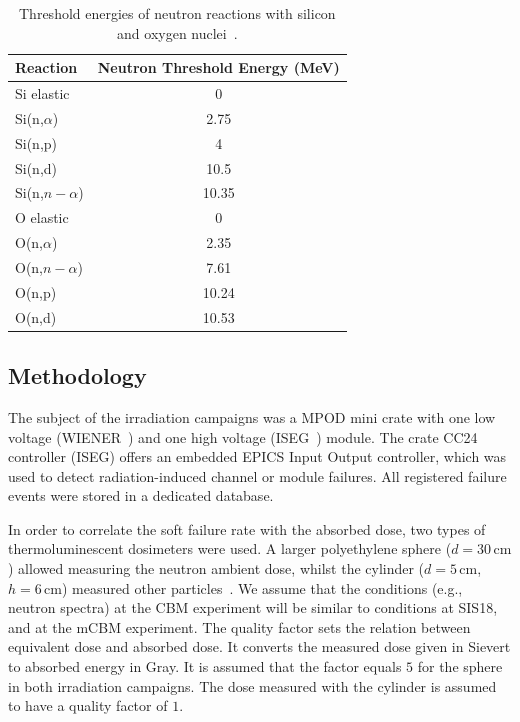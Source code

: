 \begin{table}[!h]
\centering
\caption{Threshold energies of neutron reactions with silicon and oxygen nuclei~\cite{ENDF}.}
\begin{tabular}{lc}
\hline
Reaction         & Neutron Threshold Energy (MeV) \\ \hline
Si elastic       & 0                              \\
Si(n,$\alpha$)   & 2.75                           \\
Si(n,p)          & 4                              \\
Si(n,d)          & 10.5                           \\
Si(n,$n-\alpha$) & 10.35                          \\ \hline
O elastic        & 0                              \\
O(n,$\alpha$)    & 2.35                           \\
O(n,$n-\alpha$)  & 7.61                           \\
O(n,p)           & 10.24                          \\
O(n,d)           & 10.53                         
\end{tabular}

\label{cross-seciton}
\end{table}


\subsection{Methodology}

The subject of the irradiation campaigns was a MPOD mini crate with one low voltage (WIENER~\cite{wiener}) and one high voltage (ISEG~\cite{iseg}) module. The crate CC24 controller (ISEG) offers an embedded \gls{EPICS} Input Output controller, which was used to detect radiation-induced channel or module failures. All registered  failure events were stored in a dedicated database.  

In order to correlate the soft failure rate with the absorbed dose, two types of thermoluminescent dosimeters were used. A larger polyethylene sphere ($d = 30\,\mathrm{cm}$) allowed measuring the neutron ambient dose, whilst the cylinder ($d = 5\,\mathrm{cm}$, $h = 6\,\mathrm{cm}$) measured other particles~\cite{bonner}. We assume that the conditions (e.g., neutron spectra) at the \gls{CBM} experiment will be similar to conditions at SIS18, and at the \gls{mCBM} experiment. The quality factor sets the relation between equivalent dose and absorbed dose. It converts the measured dose given in Sievert to absorbed energy in Gray. It is assumed that the factor equals $5$ for the sphere in both irradiation campaigns. The dose measured with the cylinder is assumed to have a quality factor of $1$.


